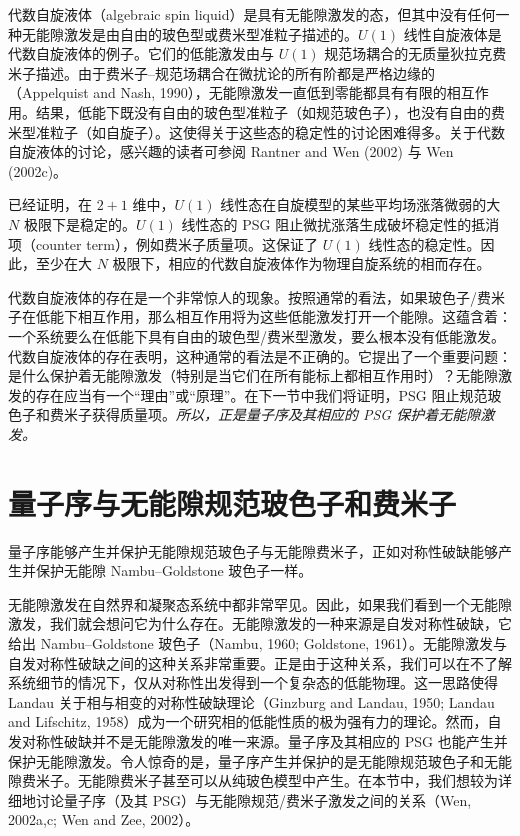 代数自旋液体（algebraic spin liquid）是具有无能隙激发的态，但其中没有任何一种无能隙激发是由自由的玻色型或费米型准粒子描述的。$U(1)$ 线性自旋液体是代数自旋液体的例子。它们的低能激发由与 $U(1)$ 规范场耦合的无质量狄拉克费米子描述。由于费米子--规范场耦合在微扰论的所有阶都是严格边缘的（Appelquist and Nash, 1990），无能隙激发一直低到零能都具有有限的相互作用。结果，低能下既没有自由的玻色型准粒子（如规范玻色子），也没有自由的费米型准粒子（如自旋子）。这使得关于这些态的稳定性的讨论困难得多。关于代数自旋液体的讨论，感兴趣的读者可参阅 Rantner and Wen (2002) 与 Wen (2002c)。

已经证明，在 $2+1$ 维中，$U(1)$ 线性态在自旋模型的某些平均场涨落微弱的大 $N$ 极限下是稳定的。$U(1)$ 线性态的 PSG 阻止微扰涨落生成破坏稳定性的抵消项（counter term），例如费米子质量项。这保证了 $U(1)$ 线性态的稳定性。因此，至少在大 $N$ 极限下，相应的代数自旋液体作为物理自旋系统的相而存在。

代数自旋液体的存在是一个非常惊人的现象。按照通常的看法，如果玻色子/费米子在低能下相互作用，那么相互作用将为这些低能激发打开一个能隙。这蕴含着：一个系统要么在低能下具有自由的玻色型/费米型激发，要么根本没有低能激发。代数自旋液体的存在表明，这种通常的看法是不正确的。它提出了一个重要问题：是什么保护着无能隙激发（特别是当它们在所有能标上都相互作用时）？无能隙激发的存在应当有一个“理由”或“原理”。在下一节中我们将证明，PSG 阻止规范玻色子和费米子获得质量项。\emph{所以，正是量子序及其相应的 PSG 保护着无能隙激发。}

\section{量子序与无能隙规范玻色子和费米子}

\begin{keypoints}
\item 量子序能够产生并保护无能隙规范玻色子与无能隙费米子，正如对称性破缺能够产生并保护无能隙 Nambu--Goldstone 玻色子一样。
\end{keypoints}

无能隙激发在自然界和凝聚态系统中都非常罕见。因此，如果我们看到一个无能隙激发，我们就会想问它为什么存在。无能隙激发的一种来源是自发对称性破缺，它给出 Nambu--Goldstone 玻色子（Nambu, 1960; Goldstone, 1961）。无能隙激发与自发对称性破缺之间的这种关系非常重要。正是由于这种关系，我们可以在不了解系统细节的情况下，仅从对称性出发得到一个复杂态的低能物理。这一思路使得 Landau 关于相与相变的对称性破缺理论（Ginzburg and Landau, 1950; Landau and Lifschitz, 1958）成为一个研究相的低能性质的极为强有力的理论。然而，自发对称性破缺并不是无能隙激发的唯一来源。量子序及其相应的 PSG 也能产生并保护无能隙激发。令人惊奇的是，量子序产生并保护的是无能隙规范玻色子和无能隙费米子。无能隙费米子甚至可以从纯玻色模型中产生。在本节中，我们想较为详细地讨论量子序（及其 PSG）与无能隙规范/费米子激发之间的关系（Wen, 2002a,c; Wen and Zee, 2002）。

